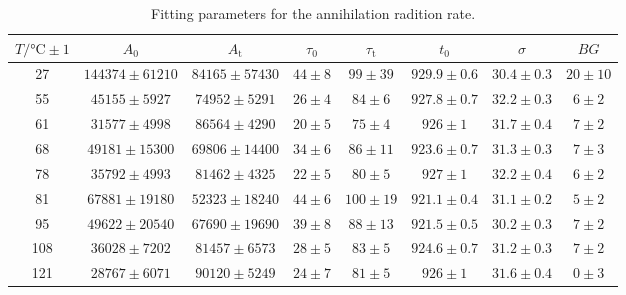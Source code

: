 \begin{table}[h]
\centering
\caption{Fitting parameters for the annihilation radition rate.}
\begin{tabular}{c| ccccccc}
\toprule
$T/\si{\celsius} \pm 1$ & $A_0$ & $A_\mathrm{t}$ & $\tau_0$ & $\tau_\mathrm{t}$ & $t_0$ & $\sigma$ & $BG$\\
\midrule
  27& $ 144374\pm 61210$ & $ 84165\pm 57430$ & $ 44\pm 8$ & $ 99\pm 39$ & $ 929.9\pm 0.6$ & $ 30.4\pm 0.3$ & $ 20\pm 10$ \\
  55& $ 45155\pm 5927$ & $ 74952\pm 5291$ & $ 26\pm 4$ & $ 84\pm 6$ & $ 927.8\pm 0.7$ & $ 32.2\pm 0.3$ & $ 6\pm 2$ \\
  61& $ 31577\pm 4998$ & $ 86564\pm 4290$ & $ 20\pm 5$ & $ 75\pm 4$ & $ 926\pm 1$ & $ 31.7\pm 0.4$ & $ 7\pm 2$ \\
  68& $ 49181\pm 15300$ & $ 69806\pm 14400$ & $ 34\pm 6$ & $ 86\pm 11$ & $ 923.6\pm 0.7$ & $ 31.3\pm 0.3$ & $ 7\pm 3$ \\
  78& $ 35792\pm 4993$ & $ 81462\pm 4325$ & $ 22\pm 5$ & $ 80\pm 5$ & $ 927\pm 1$ & $ 32.2\pm 0.4$ & $ 6\pm 2$ \\
  81& $ 67881\pm 19180$ & $ 52323\pm 18240$ & $ 44\pm 6$ & $ 100\pm 19$ & $ 921.1\pm 0.4$ & $ 31.1\pm 0.2$ & $ 5\pm 2$ \\
  95& $ 49622\pm 20540$ & $ 67690\pm 19690$ & $ 39\pm 8$ & $ 88\pm 13$ & $ 921.5\pm 0.5$ & $ 30.2\pm 0.3$ & $ 7\pm 2$ \\
  108& $ 36028\pm 7202$ & $ 81457\pm 6573$ & $ 28\pm 5$ & $ 83\pm 5$ & $ 924.6\pm 0.7$ & $ 31.2\pm 0.3$ & $ 7\pm 2$ \\
  121& $ 28767\pm 6071$ & $ 90120\pm 5249$ & $ 24\pm 7$ & $ 81\pm 5$ & $ 926\pm 1$ & $ 31.6\pm 0.4$ & $ 0\pm 3$ \\
\bottomrule
\end{tabular}
\label{tab:fit_rate}
\end{table}


